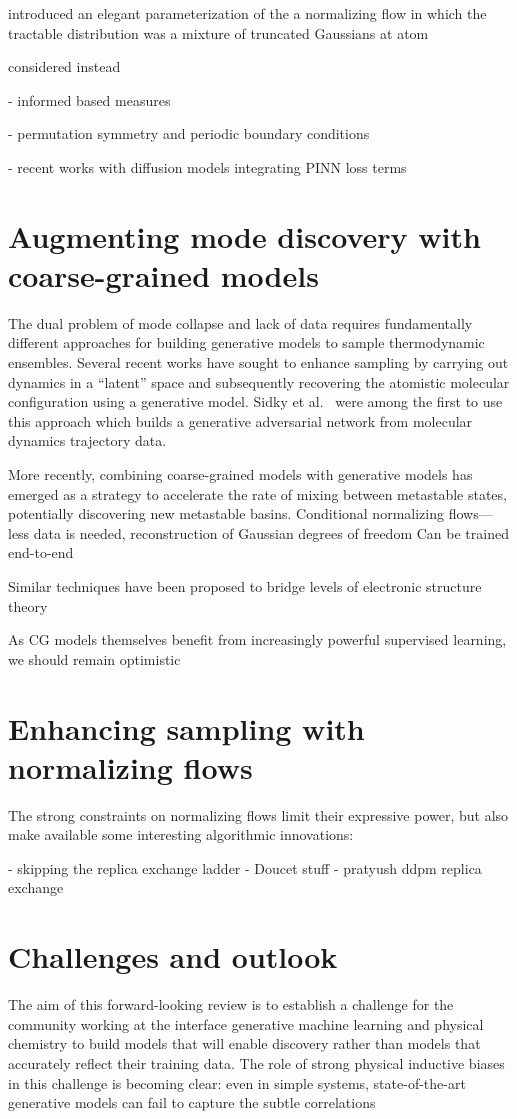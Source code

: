 \documentclass[11pt]{article}
\begin{document}
introduced an elegant parameterization of the a normalizing flow in which the tractable distribution was a mixture of truncated Gaussians at atom

considered instead 


- informed based measures

- permutation symmetry and periodic boundary conditions

- recent works with diffusion models integrating PINN loss terms

\section{Augmenting mode discovery with coarse-grained models}

The dual problem of mode collapse and lack of data requires fundamentally different approaches for building generative models to sample thermodynamic ensembles.
Several recent works have sought to enhance sampling by carrying out dynamics in a ``latent'' space and subsequently recovering the atomistic molecular configuration using a generative model.
Sidky et al.~\cite{sidky_molecular_2020} were among the first to use this approach which builds a generative adversarial network from molecular dynamics trajectory data. 

More recently, combining coarse-grained models with generative models has emerged as a strategy to accelerate the rate of mixing between metastable states, potentially discovering new metastable basins.
Conditional normalizing flows---less data is needed, reconstruction of Gaussian degrees of freedom
Can be trained end-to-end

Similar techniques have been proposed to bridge levels of electronic structure theory

As CG models themselves benefit from increasingly powerful supervised learning, we should remain optimistic

\section{Enhancing sampling with normalizing flows}

The strong constraints on normalizing flows limit their expressive power, but also make available some interesting algorithmic innovations:

- skipping the replica exchange ladder
- Doucet stuff
- pratyush ddpm replica exchange 

\section{Challenges and outlook}

The aim of this forward-looking review is to establish a challenge for the community working at the interface generative machine learning and physical chemistry to build models that will enable discovery rather than models that accurately reflect their training data. 
The role of strong physical inductive biases in this challenge is becoming clear: even in simple systems, state-of-the-art generative models can fail to capture the subtle correlations  


  
 
\end{document}
